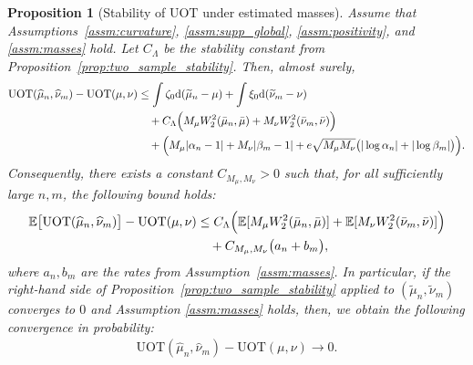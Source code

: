 \documentclass[11pt,reqno]{amsart}
\newtheorem{proposition}[theorem]{Proposition}
\theoremstyle{definition}
\renewcommand{\d}{\mathrm{d}}
\renewcommand{\hat}{\widehat}
\renewcommand{\tilde}{\widetilde}
\newcommand{\Ep}{\mathbb{E}}
\begin{document}
\begin{proposition}[Stability of $\mathrm{UOT}$ under estimated masses]
\label{prop:estimated_mass_stability}
Assume that Assumptions~\ref{assm:curvature}, \ref{assm:supp_global}, \ref{assm:positivity}, and \ref{assm:masses} hold.
Let $C_\Lambda$ be the stability constant from Proposition~\ref{prop:two_sample_stability}.
Then, almost surely,
\begin{equation}
\label{eq:estimated_mass_stability}
\begin{aligned}
\mathrm{UOT}(\hat\mu_n,\hat\nu_m) - \mathrm{UOT}(\mu,\nu)
&\le \int \zeta_0  \d(\tilde\mu_n-\mu) + \int \xi_0  \d(\tilde\nu_m-\nu) \\
&\quad + C_\Lambda\Bigl( M_\mu W_2^2(\bar\mu_n,\bar\mu) + M_\nu W_2^2(\bar\nu_m,\bar\nu) \Bigr) \\
&\quad + \Bigl( M_\mu|\alpha_n-1| + M_\nu|\beta_m-1| + e\sqrt{M_\mu M_\nu}\bigl(|\log \alpha_n| + |\log \beta_m|\bigr) \Bigr).
\end{aligned}
\end{equation}
Consequently, there exists a constant $C_{M_\mu,M_\nu}>0$ such that, for all sufficiently large $n,m$, the following bound holds:
\begin{equation}
\label{eq:estimated_mass_stability_linearized}
\begin{aligned}
\Ep\bigl[\mathrm{UOT}(\hat\mu_n,\hat\nu_m)\bigr] - \mathrm{UOT}(\mu,\nu)
&\le C_\Lambda\Bigl( \Ep[M_\mu W_2^2(\bar\mu_n,\bar\mu)] + \Ep[M_\nu W_2^2(\bar\nu_m,\bar\nu)] \Bigr) \\
&\quad + C_{M_\mu,M_\nu}\bigl( a_n + b_m \bigr),
\end{aligned}
\end{equation}
where $a_n,b_m$ are the rates from Assumption~\ref{assm:masses}.
In particular, if the right-hand side of Proposition~\ref{prop:two_sample_stability} applied to $(\tilde\mu_n,\tilde\nu_m)$ converges to $0$ and Assumption \ref{assm:masses} holds, then, we obtain the following convergence in probability:
\begin{align}
    \mathrm{UOT}(\hat\mu_n,\hat\nu_m) - \mathrm{UOT}(\mu,\nu) \to 0.
\end{align}
\end{proposition}
\end{document}

